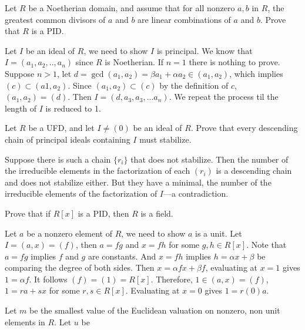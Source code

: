 \documentclass[12pt,letterpaper,boxed]{hmcpset}
\begin{document}
\begin{problem}[2.7]
Let $R$ be a Noetherian domain, and assume that for all nonzero $a, b$ in $R$, the greatest common divisors of $a$ and $b$ are linear combinations of $a$ and $b$. Prove that $R$ is a PID.
\end{problem}
\begin{solution}
Let $I$ be an ideal of $R$, we need to show $I$ is principal. We know that $I=(a_1,a_2,..,a_n)$ since $R$ is Noetherian. If $n=1$ there is nothing to prove. Suppose $n>1$, let $d=\gcd(a_1,a_2)=\beta a_1+\alpha a_2\in (a_1,a_2)$, which implies $(c)\subset (a1,a_2)$. Since $(a_1,a_2)\subset (c)$ by the definition of $c$, $(a_1,a_2)=(d)$. Then $I=(d,a_3,a_3,...a_n)$. We repeat the process til the length of $I$ is reduced to 1.
\end{solution}

\begin{problem}[2.8]
Let $R$ be a UFD, and let $I\neq (0)$ be an ideal of $R$. Prove that every descending
chain of principal ideals containing $I$ must stabilize.
\end{problem}
\begin{solution}
    Suppose there is such a chain $\{r_{i}\}$ that does not stabilize. Then the number of the irreducible elements in the factorization of each $(r_i)$ is a descending chain and does not stabilize either. But they have a minimal, the number of the irreducible elements of the factorization of $I$—a contradiction.
\end{solution}

\begin{problem}[2.12]
    Prove that if $R[x]$ is a PID, then $R$ is a field.
\end{problem}
\begin{solution}
    Let $a$ be a nonzero element of $R$, we need to show $a$ is a unit. Let $I=(a,x)=(f)$, then $a=fg$ and $x=fh$ for some $g,h\in R[x]$. Note that $a=fg$ implies $f$ and $g$ are constants. And $x=fh$ implies $h=\alpha x+\beta$ be comparing the degree of both sides. Then $x=\alpha fx+\beta f$, evaluating at $x=1$ gives $1=\alpha f$. It follows $(f)=(1)=R[x]$. Therefore, $1\in (a,x)=(f)$, $1=ra+sx$ for some $r,s\in R[x]$. Evaluating at $x=0$ gives $1=r(0)a$.
\end{solution}

\begin{problem}[2.17]
    
\end{problem}
\begin{solution}
    Let $m$ be the smallest value of the Euclidean valuation on nonzero, non unit elements in $R$. Let $u$ be 
\end{solution}
\end{document}
